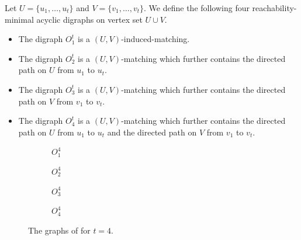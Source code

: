 \begin{definition}
\label{def:canonical}
Let $U = \{u_1,\ldots,u_t\}$ and $V = \{v_1,\ldots,v_t\}$. We define the following four reachability-minimal acyclic digraphs on vertex set $U \cup V$.
\begin{itemize}
\item The digraph $O_1^t$ is a $(U,V)$-induced-matching.
\item The digraph $O_2^t$ is a $(U,V)$-matching which further contains the directed path on $U$ from $u_1$ to $u_t$.
\item The digraph $O_3^t$ is a $(U,V)$-matching which further contains the directed path on $V$ from $v_1$ to $v_t$.
\item The digraph $O_4^t$  is a $(U,V)$-matching which further contains the directed path on $U$ from $u_1$ to $u_t$ and the directed path on $V$ from $v_1$ to $v_t$.
\end{itemize}
\end{definition}

\newcommand{\onepath}[4]{
\foreach \i in {1,...,4}
{
\pgfmathsetmacro{\x}{0.75*\i+#1}
\pgfmathsetmacro{\y}{#2+.75}
\node[circ] (a\i) at (\x,\y) {};
\node[circ] (b\i) at (\x,#2) {};
\draw[->,>=stealth,thick] (a\i) -- (b\i);
}

\ifthenelse{#3=1}{
\foreach \i in {1,...,3}
{
\pgfmathtruncatemacro{\j}{\i+1}
\draw[->,>=stealth,thick] (a\i) -- (a\j);
}
}{}

\ifthenelse{#4=1}{
\foreach \i in {1,...,3}
{
\pgfmathtruncatemacro{\j}{\i+1}
\draw[->,>=stealth,thick] (b\i) -- (b\j);
}
}{}
}

\begin{figure}
\centering
\begin{subfigure}[h]{.23\textwidth}
\centering
{}
\caption*{$O_1^4$}
\end{subfigure}
\begin{subfigure}[h]{.23\textwidth}
\centering
{}
\caption*{$O_2^4$}
\end{subfigure}
\begin{subfigure}[h]{.23\textwidth}
\centering
{}
\caption*{$O_3^4$}
\end{subfigure}
\begin{subfigure}[h]{.23\textwidth}
\centering
{}
\caption*{$O_4^4$}
\end{subfigure}
\caption{The graphs of  for $t=4$.}
\label{fig:conf}
\end{figure}

